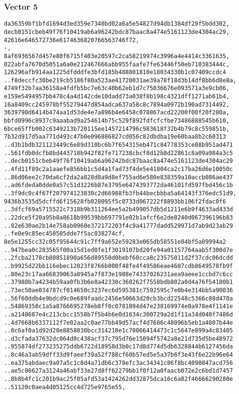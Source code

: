 \documentclass[
]{article}
\begin{document}
\hypertarget{vector-5-2}{%
\subsubsection{Vector 5}\label{vector-5-2}}

\begin{verbatim}
da36359bf1bfd1694d3ed359e7340bd02a6a5e54827d94db1384df29f5bdd302,
decb0151cbeb49f76f10419ab6a96242bdc87baac8a474e5161123de4304ac29,
42616e646572736e6174636820766563746f72,
-,
8af6936567d457e80f6715f403e20597c2ca58219974c3996a4e4414c3361635,
022abfa7670d5051a6a0e212467666abb955faafe7fe63446f50eb710383444c,
126296afb914aa1225dfdddfe3bfd185b488801810e18034330b1c07409ccdc4
..f8deccfc30be219cb5186f80a523ae41720031ae39a78f18d3b14df8bb6d8e8a,
4749f32b7aa36158a4fdfb5bc7e63c40b62eb1d7c75036676e093571a3e9cb06,
e159e5494957bb478c4a4d142cde10dadd73a038f8b198c4321dff1271ab61b4,
16a8409cc245978bf55279447d854adca637a58c8c7894a0972b190ad7314492,
3639790d6414b474aa1d53de4e7a896b4e6458c078867acd22200f00f20f280a,
bbfd0996c8937c9aaabad9a254614b75c529f892fdfcfcfbe73486888545b610,
6bce65ffb002c6349213b720115ee1457214796c983618f32b4b79c8c559851b,
7b32d917d5aa771d493c47b0e096886827cd056c82dbdba19e60baa8b2c60313
..d3b1bdb321123449c6e89d310bc6b7f654315eb471c84778353ce08b951ad471
..561fdb0dcfb8bd443718b942f82fe717238cbcf8d12b8d22861c8a09a984a3c5
..decb0151cbeb49f76f10419ab6a96242bdc87baac8a474e5161123de4304ac29
..4fd11f89c2a1aaefe856bb1c5d4a1fad73f4de5e41804ca2c17ba26d6e10050c
..86d06ee2c70da6cf2da2a828d8a9d8ef755ad6e580e838359a10accb086ae437
..ad6fdeda0dde0a57c51d3226b87e3795e6474393772da46101fd597fbd456c1b
..3f9dc0c4f67f207974123830c2d66988fb3fb44becbbba5a64143f376edc51d9,
9436b3535d5dcffd6f15628fb028095f5c0733d067222f8893bb106f2fdac0f6
..3dfcf69a5715522c7318b9b311264ee5a2b499057db5d1211e6b9f4633ad433d
..22dce5f20a95b8a8618b99539bb697791e02b1afcf6e2de8240d067396196b83
..92e630ae2b14e758ab0960e372172203f4c9a41777dadd529971d7ab9d23ab29
..fe0e9c85ec450505dde7f5ac038274cf,
8e5e1255cc32c05f95644c91c7ff9a652e59283e065db58551e84bf5a09994a2
..947bea0c283565f00a15d1ed0fe1f3019107bd20fe94a01157764aab5f300d7e
..2fcba2178cb80851890a656d89550d0bebf60cca8c23575011d2f37cdc06dcdd
..b9925d22bb116ebec12023f8766b000f48fe4f49586eae4607cdb8649578fb9f
..80e23c17aa66839063a8945a7f873e1988e74337026231aea9aeee1ccbd7c6cc
..37988b7a4234b59aa0fb3b6e8a42330c368262f7558bdb802a0d4a76f54180b1
..73ec50ae034787cf014650c3237ec6d595381c7592595c7e0b4e314bb5a90036
..56f60ddb4e9bdcd9c0e689faadc2456e50663d20cb3bcd22548c5366c88d470a
..54869350c1a5a8766695278eb8ff0c0781894d47e238169974e0a978e4f1141e
..a2148687e4c213cbcc1558b7f5b4b6e0d1634c300729a2d1f11a34d040f7486d
..4d7668b6337112f7e02aa2c0ae77bb49d57acf4d7686c48096b5eb1a4807b44e
..0c6af0a1d92d20e8858030bcc314218e1c70066414473c1c5647e899a4c83405
..d3cfada37632dc064d0c438acf37c795d76e15094f5742a8e21d735d5be48972
..955874df273235275ddb6722d18958d3b0c17d8d774d5db6328844b6127456da
..8c46a3ab59dff33d9faeef39a52f788cf60b57ed5e5a37b6f3e43f6e22b96e64
..ea375abdaec9a07a5c1c8d4a71db6c378efc3ac34341c86f8bc4090847acd756
..ae5c86627a3124a46abf33e27d8ff62279bb1f0f12a0faacb072e2c6bd1d7457
..8b8b4fc1c201b9ac25f05afd53a1424262dd32875dca16c6a82f46666290280e
..51120c0aea4d05125cc4d725e9765e55,
\end{verbatim}
\end{document}
